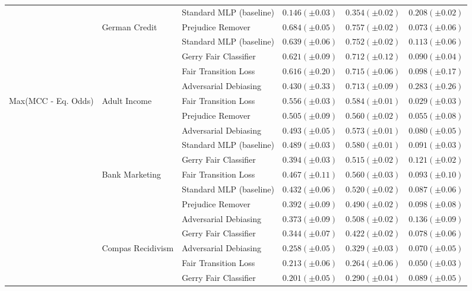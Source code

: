 \begin{tabular}{llllll}
 &  & Standard MLP (baseline) & $0.146 (\pm0.03)$ & $0.354 (\pm0.02)$ & $0.208 (\pm0.02)$ \\
\cline{2-6}
 & \multirow[t]{5}{*}{German Credit} & Prejudice Remover & $0.684 (\pm0.05)$ & $0.757 (\pm0.02)$ & $0.073 (\pm0.06)$ \\
 &  & Standard MLP (baseline) & $0.639 (\pm0.06)$ & $0.752 (\pm0.02)$ & $0.113 (\pm0.06)$ \\
 &  & Gerry Fair Classifier & $0.621 (\pm0.09)$ & $0.712 (\pm0.12)$ & $0.090 (\pm0.04)$ \\
 &  & Fair Transition Loss & $0.616 (\pm0.20)$ & $0.715 (\pm0.06)$ & $0.098 (\pm0.17)$ \\
 &  & Adversarial Debiasing & $0.430 (\pm0.33)$ & $0.713 (\pm0.09)$ & $0.283 (\pm0.26)$ \\
\cline{1-6} \cline{2-6}
\multirow[t]{20}{*}{Max(MCC - Eq. Odds)} & \multirow[t]{5}{*}{Adult Income} & Fair Transition Loss & $0.556 (\pm0.03)$ & $0.584 (\pm0.01)$ & $0.029 (\pm0.03)$ \\
 &  & Prejudice Remover & $0.505 (\pm0.09)$ & $0.560 (\pm0.02)$ & $0.055 (\pm0.08)$ \\
 &  & Adversarial Debiasing & $0.493 (\pm0.05)$ & $0.573 (\pm0.01)$ & $0.080 (\pm0.05)$ \\
 &  & Standard MLP (baseline) & $0.489 (\pm0.03)$ & $0.580 (\pm0.01)$ & $0.091 (\pm0.03)$ \\
 &  & Gerry Fair Classifier & $0.394 (\pm0.03)$ & $0.515 (\pm0.02)$ & $0.121 (\pm0.02)$ \\
\cline{2-6}
 & \multirow[t]{5}{*}{Bank Marketing} & Fair Transition Loss & $0.467 (\pm0.11)$ & $0.560 (\pm0.03)$ & $0.093 (\pm0.10)$ \\
 &  & Standard MLP (baseline) & $0.432 (\pm0.06)$ & $0.520 (\pm0.02)$ & $0.087 (\pm0.06)$ \\
 &  & Prejudice Remover & $0.392 (\pm0.09)$ & $0.490 (\pm0.02)$ & $0.098 (\pm0.08)$ \\
 &  & Adversarial Debiasing & $0.373 (\pm0.09)$ & $0.508 (\pm0.02)$ & $0.136 (\pm0.09)$ \\
 &  & Gerry Fair Classifier & $0.344 (\pm0.07)$ & $0.422 (\pm0.02)$ & $0.078 (\pm0.06)$ \\
\cline{2-6}
 & \multirow[t]{5}{*}{Compas Recidivism} & Adversarial Debiasing & $0.258 (\pm0.05)$ & $0.329 (\pm0.03)$ & $0.070 (\pm0.05)$ \\
 &  & Fair Transition Loss & $0.213 (\pm0.06)$ & $0.264 (\pm0.06)$ & $0.050 (\pm0.03)$ \\
 &  & Gerry Fair Classifier & $0.201 (\pm0.05)$ & $0.290 (\pm0.04)$ & $0.089 (\pm0.05)$ \\

\end{tabular}
